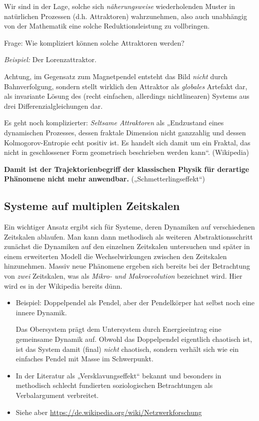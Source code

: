 \documentclass[11pt,a4paper]{article}
\begin{document}
Wir sind in der Lage, solche sich \emph{näherungsweise} wiederholenden Muster
in natürlichen Prozessen (d.h. Attraktoren) wahrzunehmen, also auch unabhängig
von der Mathematik eine solche Reduktionsleistung zu vollbringen.

Frage: Wie kompliziert können solche Attraktoren werden?

\emph{Beispiel:} Der Lorenzattraktor.
  
Achtung, im Gegensatz zum Magnetpendel entsteht das Bild \emph{nicht} durch
Bahnverfolgung, sondern stellt wirklich den Attraktor als \emph{globales}
Artefakt dar, als invariante Lösung des (recht einfachen, allerdings
nichtlinearen) Systems aus drei Differenzialgleichungen dar.

Es geht noch komplizierter: \emph{Seltsame Attraktoren} als „Endzustand eines
dynamischen Prozesses, dessen fraktale Dimension nicht ganzzahlig und dessen
Kolmogorov-Entropie echt positiv ist. Es handelt sich damit um ein Fraktal,
das nicht in geschlossener Form geometrisch beschrieben werden kann“.
(Wikipedia)

\textbf{Damit ist der Trajektorienbegriff der klassischen Physik für
derartige Phänomene nicht mehr anwendbar.} („Schmetterlingseffekt“)

\subsection{Systeme auf multiplen Zeitskalen}

Ein wichtiger Ansatz ergibt sich für Systeme, deren Dynamiken auf
verschiedenen Zeitskalen ablaufen. Man kann dann methodisch als weiteren
Abstraktionsschritt zunächst die Dynamiken auf den einzelnen Zeitskalen
untersuchen und später in einem erweiterten Modell die Wechselwirkungen
zwischen den Zeitskalen hinzunehmen. Massiv neue Phänomene ergeben sich
bereits bei der Betrachtung von \emph{zwei} Zeitskalen, was als \emph{Mikro-
  und Makroevolution} bezeichnet wird. Hier wird es in der Wikipedia bereits
dünn.

\begin{itemize}[noitemsep]
\item Beispiel: Doppelpendel als Pendel, aber der Pendelkörper hat selbst noch
  eine innere Dynamik.

  Das Obersystem prägt dem Untersystem durch Energieeintrag eine gemeinsame
  Dynamik auf. Obwohl das Doppelpendel eigentlich chaotisch ist, ist das
  System damit (final) \emph{nicht} chaotisch, sondern verhält sich wie ein
  einfaches Pendel mit Masse im Schwerpunkt.
\item In der Literatur als „Versklavungseffekt“ bekannt und besonders in
  methodisch schlecht fundierten soziologischen Betrachtungen als
  Verbalargument verbreitet.
\item Siehe aber \url{https://de.wikipedia.org/wiki/Netzwerkforschung}
\end{itemize}
\end{document}
